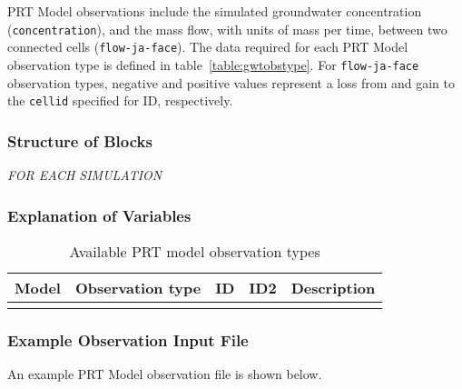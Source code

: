 
PRT Model observations include the simulated groundwater concentration (\texttt{concentration}), and the mass flow, with units of mass per time, between two connected cells (\texttt{flow-ja-face}). The data required for each PRT Model observation type is defined in table~\ref{table:gwtobstype}. For \texttt{flow-ja-face} observation types, negative and positive values represent a loss from and gain to the \texttt{cellid} specified for ID, respectively.

\subsubsection{Structure of Blocks}
\vspace{5mm}

\noindent \textit{FOR EACH SIMULATION}



\subsubsection{Explanation of Variables}
\begin{description}

\end{description}


\begin{longtable}{p{2cm} p{2.75cm} p{2cm} p{1.25cm} p{7cm}}
\caption{Available PRT model observation types} \tabularnewline

\hline
\hline
\textbf{Model} & \textbf{Observation type} & \textbf{ID} & \textbf{ID2} & \textbf{Description} \\
\hline
\endhead

\hline
\endfoot

\end{longtable}

\vspace{5mm}
\subsubsection{Example Observation Input File}

An example PRT Model observation file is shown below.



